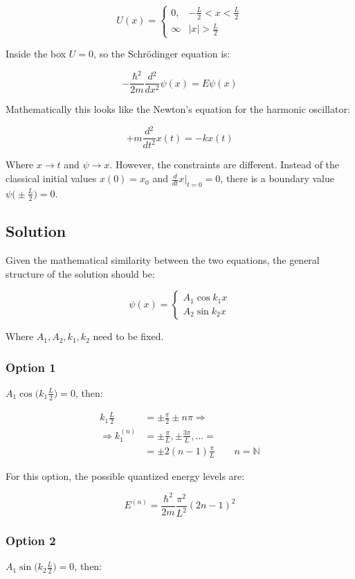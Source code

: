 $$U(x) = \begin{cases} 0, &-\frac{L}{2}<x<\frac{L}{2}\\\infty &|x|>\frac{L}{2}\end{cases}$$

Inside the box $U=0$, so the Schr\"odinger equation is:

$$-\frac{\hbar^2}{2m}\frac{d{^2}}{d{x^2}}\psi(x) = E\psi(x)$$

Mathematically this looks like the Newton's equation for the harmonic oscillator:

$$+m \frac{d{^2}}{d{t^2}}x(t) = -kx(t)$$

Where $x\rightarrow t$ and $\psi\rightarrow x$.
However, the constraints are different. Instead of the classical initial values $x(0) = x_0$ and $\frac{d{}}{d{t}}x|_{t=0} = 0$, there is a boundary value $\psi\bigl(\pm \frac{L}{2}\bigr) = 0$.

  \subsection{Solution}
  Given the mathematical similarity between the two equations, the general structure of the solution should be:

  $$\psi(x) = \begin{cases}A_1\cos k_1 x \\A_2\sin k_2x\end{cases}$$

  Where $A_1,A_2,k_1, k_2$ need to be fixed.

    \subsubsection{Option 1}
    $A_1\cos\biggl(k_1 \frac{L}{2}\biggr) = 0$, then:

    \begin{align*}
      k_1 \frac{L}{2} &=\pm \frac{\pi}{2}\pm n\pi\Rightarrow\\
      \Rightarrow k_1^{(n)} &=\pm \frac{\pi}{L},\pm \frac{3\pi}{L},\dots =\\
                            &= \pm 2(n-1)\frac{\pi}{L}\qquad n = \mathbb{N}
    \end{align*}

    For this option, the possible quantized energy levels are:

    $$E^{(n)} = \frac{\hbar^2}{2m}\frac{\pi^2}{L^2}(2n-1)^2$$

    \subsubsection{Option 2}
    $A_1\sin\biggl(k_2 \frac{L}{2}\biggr) = 0$, then:

